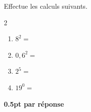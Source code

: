 
\question[2]
Effectue les calculs suivants.	

\vspace{10pt}
\setlength{\columnsep}{50pt}
\begin{multicols}{2}
\begin{enumerate}[leftmargin=*,align=parleft, label=\alph*), itemsep=25pt]
\item $8^2 =$ 
\item $0,6^2=$ 
\item $2^5=$ 
\item $19^0=$ 
\end{enumerate}
\end{multicols}
\setlength{\columnsep}{10pt}

\begin{solution}[0pt]
\textbf{0.5pt par réponse}
\end{solution}
